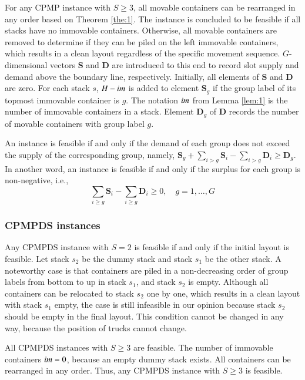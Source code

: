 \documentclass[review,3p,times,authoryear,12pt]{elsarticle}
\begin{document}
For any CPMP instance with $S\ge3$, all movable containers can be rearranged in any order based on Theorem \ref{the:1}.
The instance is concluded to be feasible if all stacks have no immovable containers.
Otherwise, all movable containers are removed to determine if they can be piled on the left immovable containers, which results in a clean layout regardless of the specific movement sequence. $G$-dimensional vectors $\mathbf S$ and $\mathbf D$ are introduced to this end to record slot supply and demand above the boundary line, respectively.
Initially, all elements of $\mathbf S$ and $\mathbf D$ are zero. For each stack $s$, $H-\id{im}$ is added to element $\mathbf S_g$ if the group label of its topmost immovable container is $g$.
The notation $\id{im}$ from Lemma \ref{lem:1} is the number of immovable containers in a stack. Element $\mathbf D_g$ of $\mathbf D$ records the number of movable containers with group label $g$.

An instance is feasible if and only if the demand of each group does not exceed the supply of the corresponding group, namely, $\mathbf S_g+\sum\limits_{i>g}\mathbf S_i-\sum\limits_{i>g}\mathbf D_i\ge \mathbf D_g$.
In another word, an instance is feasible if and only if the surplus for each group is non-negative, i.e.,
\begin{equation}
\label{equ:2}
\sum\limits_{i\ge g}\mathbf S_i-\sum\limits_{i\ge g}\mathbf D_i\ge0, \quad g=1,\dots,G
\end{equation}

\subsubsection{CPMPDS instances}

Any CPMPDS instance with $S=2$ is feasible if and only if the initial layout is feasible. Let stack $s_2$ be the dummy stack and stack $s_1$ be the other stack. A noteworthy case is that containers are piled in a non-decreasing order of group labels from bottom to up in stack $s_1$, and stack $s_2$ is empty. Although all containers can be relocated to stack $s_2$ one by one, which results in a clean layout with stack $s_1$ empty, the case is still infeasible in our opinion because stack $s_2$ should be empty in the final layout. This condition cannot be changed in any way, because the position of trucks cannot change.

All CPMPDS instances with $S\ge3$ are feasible. The number of immovable containers $\id{im}=0$, because an empty dummy stack exists. All containers can be rearranged in any order.
Thus, any CPMPDS instance with $S\ge3$ is feasible.
\end{document}
